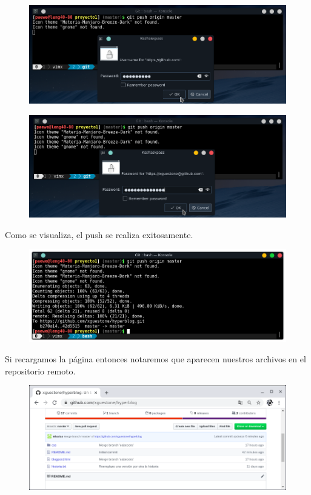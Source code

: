 \documentclass{article}
\begin{document}
\begin{figure}[h!]
  \centering
  \includegraphics[scale=0.75]{./Pictures/197_username.png}
\end{figure}

\newpage

\begin{figure}[h!]
  \centering
  \includegraphics[scale=0.75]{./Pictures/198_password.png}
\end{figure}

Como se visualiza, el push se realiza exitosamente.

\begin{figure}[h!]
  \centering
  \includegraphics[scale=0.75]{./Pictures/199_push_ok.png}
\end{figure}

Si recargamos la página entonces notaremos que aparecen nuestros archivos en el
repositorio remoto.

\begin{figure}[h!]
  \centering
  \includegraphics[scale=0.75]{./Pictures/200_github_update.png}
\end{figure}
\end{document}
